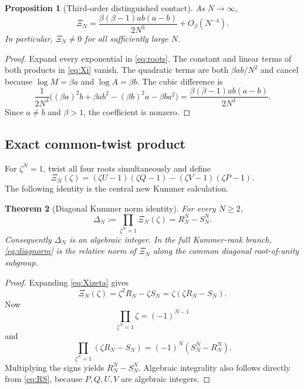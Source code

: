\documentclass[11pt]{article}
\newtheorem{theorem}{Theorem}[section]
\newtheorem{proposition}[theorem]{Proposition}
\theoremstyle{definition}
\theoremstyle{remark}
\begin{document}
\begin{proposition}[Third-order distinguished contact]\label{prop:Xiasymp}
As $N\to\infty$,
\begin{equation}\label{eq:Xiasymp}
 \Xi_N=
 \frac{\beta(\beta-1)ab(a-b)}{2N^3}+O_\beta(N^{-4}).
\end{equation}
In particular, $\Xi_N\ne0$ for all sufficiently large $N$.
\end{proposition}

\begin{proof}
Expand every exponential in \eqref{eq:roots}.  The constant and linear terms of
both products in \eqref{eq:Xi} vanish.  The quadratic terms are both
$\beta ab/N^2$ and cancel because $\log M=\beta a$ and
$\log A=\beta b$.  The cubic difference is
\[
 \frac{1}{2N^3}
 \bigl((\beta a)^2b+\beta ab^2-(\beta b)^2a-\beta ba^2\bigr)
 =\frac{\beta(\beta-1)ab(a-b)}{2N^3}.
\]
Since $a\ne b$ and $\beta>1$, the coefficient is nonzero.
\end{proof}

\subsection{Exact common-twist product}

For $\zeta^N=1$, twist all four roots simultaneously and define
\begin{equation}\label{eq:Xizeta}
 \Xi_N(\zeta)=
 (\zeta U-1)(\zeta Q-1)-(\zeta V-1)(\zeta P-1).
\end{equation}
The following identity is the central new Kummer calculation.

\begin{theorem}[Diagonal Kummer norm identity]\label{thm:diagnorm}
For every $N\ge2$,
\begin{equation}\label{eq:diagnorm}
 \Delta_N:=\prod_{\zeta^N=1}\Xi_N(\zeta)
 =R_N^N-S_N^N.
\end{equation}
Consequently $\Delta_N$ is an algebraic integer.  In the full Kummer-rank branch,
\eqref{eq:diagnorm} is the relative norm of $\Xi_N$ along the common diagonal
root-of-unity subgroup.
\end{theorem}

\begin{proof}
Expanding \eqref{eq:Xizeta} gives
\[
 \Xi_N(\zeta)=\zeta^2R_N-\zeta S_N
 =\zeta(\zeta R_N-S_N).
\]
Now
\[
 \prod_{\zeta^N=1}\zeta=(-1)^{N-1}
\]
and
\[
 \prod_{\zeta^N=1}(\zeta R_N-S_N)
 =(-1)^N(S_N^N-R_N^N).
\]
Multiplying the signs yields $R_N^N-S_N^N$.  Algebraic integrality also follows
directly from \eqref{eq:RS}, because $P,Q,U,V$ are algebraic integers.
\end{proof}
\end{document}
